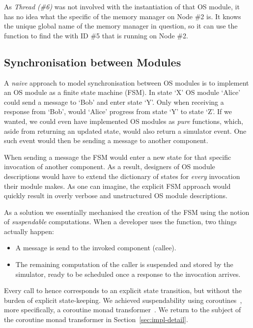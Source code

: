 As \emph{Thread (\#6)} was not involved with the instantiation of that OS module, it has no idea what the specific  of the memory manager on Node \#2 is.
It knows the unique global name of the memory manager in question, so it can use the  function to find the  with ID \#5 that is running on Node \#2.

\subsection{Synchronisation between Modules}
A \emph{naive} approach to model synchronisation between OS modules is to implement an OS module as a finite state machine (FSM).
In state `X' OS module `Alice' could send a message to `Bob' and enter state `Y'.
Only when receiving a response from `Bob', would `Alice' progress from state `Y' to state `Z'.
If we wanted, we could even have implemented OS modules as \emph{pure} functions, which, aside from returning an updated state, would also return a simulator event.
One such event would then be sending a message to another component.

When sending a message the FSM would enter a new state for that specific invocation of another component.
As a result, designers of OS module descriptions would have to extend the dictionary of states for \emph{every} invocation their module makes.
As one can imagine, the explicit FSM approach would quickly result in overly verbose and unstructured OS module descriptions.

As a solution we essentially mechanised the creation of the FSM using the notion of \emph{suspendable} computations.
When a developer uses the  function, two things actually happen:
\begin{itemize}
  \item A message is send to the invoked component (callee).
  \item The remaining computation of the caller is suspended and stored by the simulator, ready to be scheduled once a response to the invocation arrives.
\end{itemize}
Every call to  hence corresponds to an explicit state transition, but without the burden of explicit state-keeping.
We achieved suspendability using coroutines~\cite{coroutines}, more specifically, a coroutine monad transformer~\cite{cmt}.
We return to the subject of the coroutine monad transformer in Section~\ref{sec:impl-detail}.

